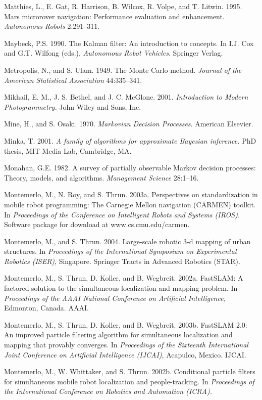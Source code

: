 \documentclass[10pt,a4paper]{article}
\begin{document}
Matthies, L., E. Gat, R. Harrison, B. Wilcox, R. Volpe, and T. Litwin. 1995. Mars
microrover navigation: Performance evaluation and enhancement. \textit{Autonomous
Robots} 2:291–311.

Maybeck, P.S. 1990. The Kalman filter: An introduction to concepts. In I.J. Cox and
G.T. Wilfong (eds.), \textit{Autonomous Robot Vehicles}. Springer Verlag.

Metropolis, N., and S. Ulam. 1949. The Monte Carlo method. \textit{Journal of the American
Statistical Association} 44:335–341.

Mikhail, E. M., J. S. Bethel, and J. C. McGlone. 2001. \textit{Introduction to Modern Photogrammetry.}
John Wiley and Sons, Inc.

Mine, H., and S. Osaki. 1970. \textit{Markovian Decision Processes}. American Elsevier.

Minka, T. 2001. \textit{A family of algorithms for approximate Bayesian inference.} PhD thesis,
MIT Media Lab, Cambridge, MA.

Monahan, G.E. 1982. A survey of partially observable Markov decision processes:
Theory, models, and algorithms. \textit{Management Science }28:1–16.

Montemerlo, M., N. Roy, and S. Thrun. 2003a. Perspectives on standardization in
mobile robot programming: The Carnegie Mellon navigation (CARMEN) toolkit.
In \textit{Proceedings of the Conference on Intelligent Robots and Systems (IROS)}. Software
package for download at www.cs.cmu.edu/carmen.

Montemerlo, M., and S. Thrun. 2004. Large-scale robotic 3-d mapping of urban structures.
In \textit{Proceedings of the International Symposium on Experimental Robotics (ISER)},
Singapore. Springer Tracts in Advanced Robotics (STAR).

Montemerlo, M., S. Thrun, D. Koller, and B. Wegbreit. 2002a. FastSLAM: A factored
solution to the simultaneous localization and mapping problem. In \textit{Proceedings of
the AAAI National Conference on Artificial Intelligence,} Edmonton, Canada. AAAI.

Montemerlo, M., S. Thrun, D. Koller, and B. Wegbreit. 2003b. FastSLAM 2.0: An
improved particle filtering algorithm for simultaneous localization and mapping
that provably converges. In \textit{Proceedings of the Sixteenth International Joint Conference
on Artificial Intelligence (IJCAI)}, Acapulco, Mexico. IJCAI.

Montemerlo, M., W. Whittaker, and S. Thrun. 2002b. Conditional particle filters for
simultaneous mobile robot localization and people-tracking. In \textit{Proceedings of the
International Conference on Robotics and Automation (ICRA).}
\end{document}
